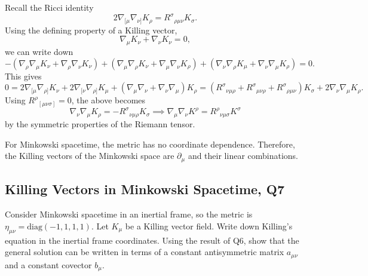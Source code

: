 \begin{solution}
    Recall the Ricci identity
    \begin{equation}
        2\nabla_{[\mu}\nabla_{\nu]}K_\rho = R^\sigma{}_{\rho\mu\nu}K_\sigma.
    \end{equation}
    Using the defining property of a Killing vector,
    \begin{equation}
        \nabla_\mu K_\nu + \nabla_\nu K_\nu = 0,
    \end{equation}
    we can write down
    \begin{equation}
        -(\nabla_\rho\nabla_\mu K_\nu + \nabla_\rho\nabla_\nu K_\nu) + (\nabla_\mu\nabla_\rho K_\nu + \nabla_\mu\nabla_\nu K_\rho) + (\nabla_\nu\nabla_\rho K_\mu + \nabla_\nu\nabla_\mu K_\rho) = 0.
    \end{equation}
    This gives
    \begin{equation}
        0=2\nabla_{[\mu}\nabla_{\rho]}K_\nu + 2\nabla_{[\nu}\nabla_{\rho]}K_\mu + (\nabla_\mu\nabla_\nu+\nabla_\nu\nabla_\mu)K_\rho = (R^\sigma{}_{\nu\mu\rho}+R^\sigma{}_{\mu\nu\rho} +R^\sigma{}_{\rho\mu\nu})K_\sigma+2\nabla_\nu\nabla_\mu K_\rho .
    \end{equation}
    Using $R^\rho{}_{[\mu\nu\sigma]}=0$, the above becomes
    \begin{equation}
        \nabla_\nu\nabla_\mu K_\rho = -R^\sigma{}_{\nu\mu\rho}K_\sigma \implies \nabla_\mu\nabla_\nu K^\rho = R^\rho{}_{\nu\mu\sigma}K^\sigma
    \end{equation}
    by the symmetric properties of the Riemann tensor.

    For Minkowski spacetime, the metric has no coordinate dependence. Therefore, the Killing vectors of the Minkowski space are $\partial_\mu$ and their linear combinations.
\end{solution}

\subsection{Killing Vectors in Minkowski Spacetime, Q7}

Consider Minkowski spacetime in an inertial frame, so the metric is $\eta_{\mu\nu} = \mathrm{diag}(-1,1,1,1)$. Let $K_\mu$ be a Killing vector field. Write down Killing's equation in the inertial frame coordinates. Using the result of Q6, show that the general solution can be written in terms of a constant antisymmetric matrix $a_{\mu\nu}$ and a constant covector $b_\mu$.

